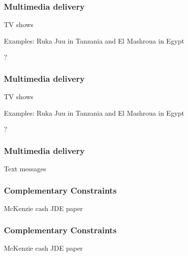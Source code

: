 \documentclass[hideothersubsections, usenames,dvipsnames,11pt]{beamer}
\newenvironment{itemize_2pt}{\itemize\addtolength{\itemsep}{2pt}}{\enditemize}
\begin{document}

\begin{frame}
\frametitle{Multimedia delivery}
	TV shows
	\begin{itemize_2pt}
	\item Examples: Ruka Juu in Tanzania \citep{Bjorvatn2020} and El Mashroua in Egypt \citep{Barsoum2018}
	\item ?
	\vspace{0.1in}
	\end{itemize_2pt}
\end{frame}

\begin{frame}
\frametitle{Multimedia delivery}
	TV shows
	\begin{itemize_2pt}
	\item Examples: Ruka Juu in Tanzania \citep{Bjorvatn2020} and El Mashroua in Egypt \citep{Barsoum2018}
	\item ?
	\vspace{0.1in}
	\end{itemize_2pt}
\end{frame}

\begin{frame}
\frametitle{Multimedia delivery}
	Text messages
	\begin{itemize_2pt}
	\item \citep{Cole2019} \citep{Acimovic2020}
	\vspace{0.1in}
	\end{itemize_2pt}
\end{frame}


\begin{frame}
\frametitle{Complementary Constraints}
	\begin{itemize_2pt}
	\item McKenzie cash JDE paper
	\item \citep{Gine2021}
	\item \cite{Berge2015}
	\item \cite{deMel2014}
	\vspace{0.1in}
	\end{itemize_2pt}
\end{frame}

\begin{frame}
\frametitle{Complementary Constraints}
	\begin{itemize_2pt}
	\item McKenzie cash JDE paper
	\vspace{0.1in}
	\end{itemize_2pt}
\end{frame}
\end{document}
